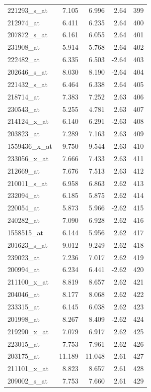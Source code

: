 \begin{footnotesize}
\begin{longtable}{lrrrr}
221293\_s\_at & 7.105 & 6.996 & 2.64 & 399 \\
212974\_at & 6.411 & 6.235 & 2.64 & 400 \\
207872\_s\_at & 6.161 & 6.055 & 2.64 & 401 \\
231908\_at & 5.914 & 5.768 & 2.64 & 402 \\
222482\_at & 6.335 & 6.503 & -2.64 & 403 \\
202646\_s\_at & 8.030 & 8.190 & -2.64 & 404 \\
221432\_s\_at & 6.464 & 6.338 & 2.64 & 405 \\
218714\_at & 7.383 & 7.252 & 2.63 & 406 \\
230543\_at & 5.255 & 4.781 & 2.63 & 407 \\
214124\_x\_at & 6.140 & 6.291 & -2.63 & 408 \\
203823\_at & 7.289 & 7.163 & 2.63 & 409 \\
1559436\_x\_at & 9.750 & 9.544 & 2.63 & 410 \\
233056\_x\_at & 7.666 & 7.433 & 2.63 & 411 \\
212669\_at & 7.676 & 7.513 & 2.63 & 412 \\
210011\_s\_at & 6.958 & 6.863 & 2.62 & 413 \\
232094\_at & 6.185 & 5.875 & 2.62 & 414 \\
220054\_at & 5.873 & 5.966 & -2.62 & 415 \\
240282\_at & 7.090 & 6.928 & 2.62 & 416 \\
1558515\_at & 6.144 & 5.956 & 2.62 & 417 \\
201623\_s\_at & 9.012 & 9.249 & -2.62 & 418 \\
239023\_at & 7.236 & 7.017 & 2.62 & 419 \\
200994\_at & 6.234 & 6.441 & -2.62 & 420 \\
211100\_x\_at & 8.819 & 8.657 & 2.62 & 421 \\
204046\_at & 8.177 & 8.068 & 2.62 & 422 \\
233315\_at & 6.145 & 6.038 & 2.62 & 423 \\
201998\_at & 8.267 & 8.409 & -2.62 & 424 \\
219290\_x\_at & 7.079 & 6.917 & 2.62 & 425 \\
223015\_at & 7.753 & 7.961 & -2.62 & 426 \\
203175\_at & 11.189 & 11.048 & 2.61 & 427 \\
211101\_x\_at & 8.823 & 8.657 & 2.61 & 428 \\
209002\_s\_at & 7.753 & 7.660 & 2.61 & 429 \\

\end{longtable}
\end{footnotesize}
